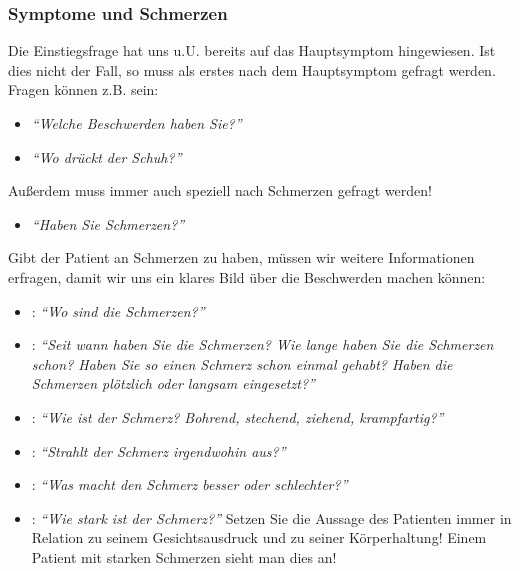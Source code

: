 \subsubsection{Symptome und Schmerzen}
Die Einstiegsfrage hat uns u.U. bereits auf das Hauptsymptom hingewiesen. Ist dies nicht der Fall, so muss als erstes nach dem Hauptsymptom gefragt werden. Fragen können z.B. sein:
\begin{itemize}
    \item \emph{"`Welche Beschwerden haben Sie?"'}
    \item \emph{"`Wo drückt der Schuh?"'}
\end{itemize}
Außerdem muss immer auch speziell nach Schmerzen gefragt werden!
\begin{itemize}
    \item \emph{"`Haben Sie Schmerzen?"'}
\end{itemize}
Gibt der Patient an Schmerzen zu haben, müssen wir weitere Informationen erfragen, damit wir uns ein klares Bild über die Beschwerden machen können:
\begin{itemize}
    \item {}: \emph{"`Wo sind die
    Schmerzen?"'}
    \item {}: \emph{"`Seit wann haben Sie
    die Schmerzen? Wie lange haben Sie die Schmerzen schon?
    Haben Sie so einen Schmerz schon einmal gehabt? Haben die
    Schmerzen plötzlich oder langsam eingesetzt?"'} 
    \item
    : \emph{"`Wie ist der Schmerz? Bohrend,
    stechend, ziehend, krampfartig?"'} 
    \item {}: \emph{"`Strahlt der Schmerz
    irgendwohin aus?"'} 
    \item {}: \emph{"`Was
    macht den Schmerz besser oder schlechter?"'} 
    \item {}: \emph{"`Wie stark ist der
    Schmerz?"'} 
    Setzen Sie die Aussage des Patienten immer in Relation zu
    seinem Gesichtsausdruck und zu seiner Körperhaltung!
    Einem Patient mit starken Schmerzen sieht man dies an!
\end{itemize}

